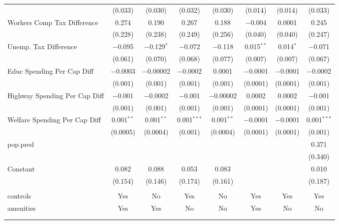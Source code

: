 \begin{table}[!htbp]
\begin{tabular}{@{\extracolsep{5pt}}lccccccc}
  & (0.033) & (0.030) & (0.032) & (0.030) & (0.014) & (0.014) & (0.033) \\ 
  Workers Comp Tax Difference & 0.274 & 0.190 & 0.267 & 0.188 & $-$0.004 & 0.0001 & 0.245 \\ 
  & (0.228) & (0.238) & (0.249) & (0.256) & (0.040) & (0.040) & (0.247) \\ 
  Unemp. Tax Difference & $-$0.095 & $-$0.129$^{*}$ & $-$0.072 & $-$0.118 & 0.015$^{**}$ & 0.014$^{*}$ & $-$0.071 \\ 
  & (0.061) & (0.070) & (0.068) & (0.077) & (0.007) & (0.007) & (0.067) \\ 
  Educ Spending Per Cap Diff & $-$0.0003 & $-$0.00002 & $-$0.0002 & 0.0001 & $-$0.0001 & $-$0.0001 & $-$0.0002 \\ 
  & (0.001) & (0.001) & (0.001) & (0.001) & (0.0001) & (0.0001) & (0.001) \\ 
  Highway Spending Per Cap Diff & $-$0.001 & $-$0.0002 & $-$0.001 & $-$0.00002 & 0.0002 & 0.0002 & $-$0.001 \\ 
  & (0.001) & (0.001) & (0.001) & (0.001) & (0.0001) & (0.0001) & (0.001) \\ 
  Welfare Spending Per Cap Diff & 0.001$^{**}$ & 0.001$^{**}$ & 0.001$^{***}$ & 0.001$^{**}$ & $-$0.0001 & $-$0.0001 & 0.001$^{***}$ \\ 
  & (0.0005) & (0.0004) & (0.001) & (0.0004) & (0.0001) & (0.0001) & (0.001) \\ 
  pop.pred &  &  &  &  &  &  & 0.371 \\ 
  &  &  &  &  &  &  & (0.340) \\ 
  Constant & 0.082 & 0.088 & 0.053 & 0.083 &  &  & 0.010 \\ 
  & (0.154) & (0.146) & (0.174) & (0.161) &  &  & (0.187) \\ 
 \hline \\[-1.8ex] 
controls & Yes & No & Yes & No & Yes & Yes & Yes \\ 
amenities & Yes & Yes & No & No & Yes & No & No \\ 
\hline \\[-1.8ex] 
\hline 
\hline \\[-1.8ex] 
\end{tabular} 
\end{table} 
